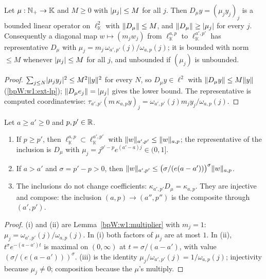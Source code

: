 \begin{lemma}\label{bpW:w1:multiplier}
Let $\mu:\mathbb{N}_+\to\mathbb K$ and $M\ge0$ with $\lvert \mu_j\rvert\le M$ for all $j$. Then $D_\mu y=(\mu_jy_j)_j$ is a bounded
linear operator on $\ell^2_{\mathbb K}$ with $\lVert D_\mu\rVert\le M$, and $\lVert D_\mu\rVert\ge\lvert \mu_j\rvert$ for every $j$.
Consequently a diagonal map $w\mapsto(m_jw_j)$ from $\ell^{a,p}_{\mathbb K}$ to $\ell^{a',p'}_{\mathbb K}$ has
representative $D_\mu$ with $\mu_j=m_j\,\omega_{a',p'}(j)/\omega_{a,p}(j)$; it is bounded with norm $\le M$ whenever
$\lvert \mu_j\rvert\le M$ for all $j$, and unbounded if $(\mu_j)$ is unbounded.
\end{lemma}

\begin{proof}
$\sum_{j\le N}\lvert \mu_jy_j\rvert^2\le M^2\lVert y\rVert^2$ for every $N$, so $D_\mu y\in\ell^2$ with $\lVert D_\mu y\rVert\le M\lVert y\rVert$
(\ref{bpW:w1:ext-lp}); $\lVert D_\mu e_j\rVert=\lvert \mu_j\rvert$ gives the lower bound. The representative is computed
coordinatewise: $\tau_{a',p'}(m\,\kappa_{a,p}y)_j=\omega_{a',p'}(j)m_jy_j/\omega_{a,p}(j)$.
\end{proof}

\begin{lemma}[Embeddings]\label{bpW:w1:embed}
Let $a\ge a'\ge0$ and $p,p'\in\mathbb{R}$.
\begin{enumerate}[label=(\roman*)]
\item If $p\ge p'$, then $\ell^{a,p}_{\mathbb K}\subset\ell^{a',p'}_{\mathbb K}$ with $\lVert w\rVert_{a',p'}\le\lVert w\rVert_{a,p}$;
  the representative of the inclusion is $D_\mu$ with $\mu_j=j^{p'-p}e^{(a'-a)j}\in(0,1]$.
\item If $a>a'$ and $\sigma=p'-p>0$, then $\lVert w\rVert_{a',p'}\le\bigl(\sigma/(e(a-a'))\bigr)^\sigma\lVert w\rVert_{a,p}$.
\item The inclusions do not change coefficients: $\kappa_{a',p'}D_\mu=\kappa_{a,p}$. They are injective and compose:
  the inclusion $(a,p)\to(a'',p'')$ is the composite through $(a',p')$.
\end{enumerate}
\end{lemma}

\begin{proof}
(i) and (ii) are Lemma~\ref{bpW:w1:multiplier} with $m_j=1$: $\mu_j=\omega_{a',p'}(j)/\omega_{a,p}(j)$. In (i) both
factors of $\mu_j$ are at most $1$. In (ii), $t^\sigma e^{-(a-a')t}$ is maximal on $(0,\infty)$ at
$t=\sigma/(a-a')$, with value $(\sigma/(e(a-a')))^\sigma$. (iii) is the identity
$\mu_j/\omega_{a',p'}(j)=1/\omega_{a,p}(j)$; injectivity because $\mu_j\ne0$; composition because the $\mu$'s multiply.
\end{proof}

